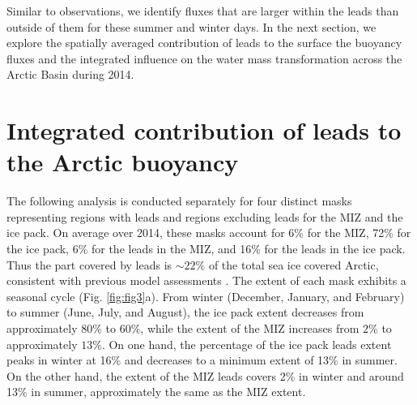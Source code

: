 \documentclass[lineno,sn-basic]{sn-jnl}%
\begin{document}
Similar to observations, we identify fluxes that are larger within the leads than outside of them for these summer and winter days. In the next section, we explore the spatially averaged contribution of leads to the surface the buoyancy fluxes and the integrated influence on the water mass transformation across the Arctic Basin during 2014. 

\section{Integrated contribution of leads to the Arctic buoyancy}\label{sec3}

The following analysis is conducted separately for four distinct masks representing regions with leads and regions excluding leads for the MIZ and the ice pack. On average over 2014, these masks account for 6\% for the MIZ, 72\% for the ice pack, 6\% for the leads in the MIZ, and 16\% for the leads in the ice pack. Thus the part covered by leads is $\sim 22\%$ of the total sea ice covered Arctic, consistent with previous model assessments \citep{Wang_leads_2016}. 
The extent of each mask exhibits a seasonal cycle (Fig. \ref{fig:fig3}a). From winter (December, January, and February) to  summer (June, July, and August), the ice pack extent decreases from approximately $80\%$ to $60\%$, while the extent of the MIZ increases from $2\%$ to approximately $13\%$. 
On one hand, the percentage of the ice pack leads extent peaks in winter at 16\% and decreases to a minimum extent of 13\% in summer. On the other hand, the extent of the MIZ leads covers 2\% in winter and around 13\% in summer, approximately the same as the MIZ extent. 
\end{document}
